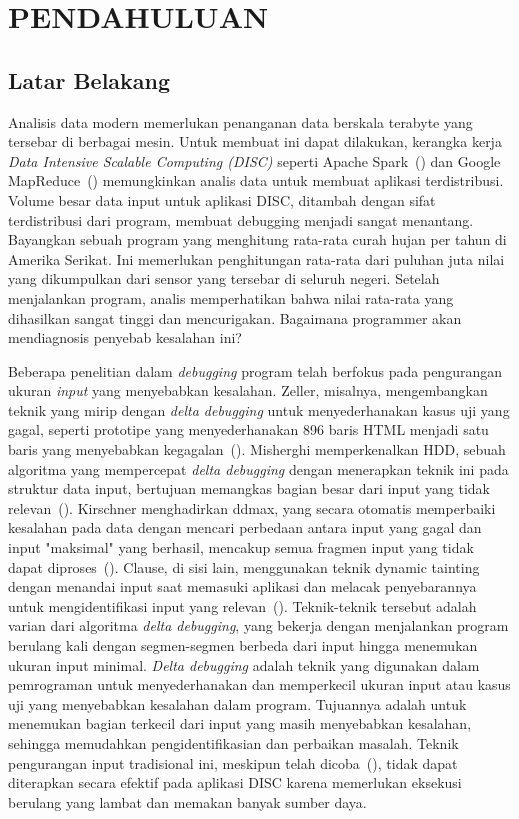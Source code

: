 \chapter{PENDAHULUAN}\label{chap:pendahuluan}


\section{Latar Belakang}\label{sec:latarbelakang}

Analisis data modern memerlukan penanganan data berskala 
terabyte yang tersebar di berbagai mesin. Untuk membuat 
ini dapat dilakukan, kerangka kerja 
\emph{Data Intensive Scalable Computing (DISC)} seperti 
Apache Spark~(\cite{zaharia2010,spark}) dan 
Google MapReduce~(\cite{dean2008}) memungkinkan analis 
data untuk membuat aplikasi terdistribusi. Volume besar 
data input untuk aplikasi DISC, ditambah dengan sifat 
terdistribusi dari program, membuat debugging menjadi 
sangat menantang.
Bayangkan sebuah program yang menghitung rata-rata 
curah hujan per tahun di Amerika Serikat. Ini 
memerlukan penghitungan rata-rata dari puluhan 
juta nilai yang dikumpulkan dari sensor yang 
tersebar di seluruh negeri. Setelah menjalankan 
program, analis memperhatikan bahwa nilai rata-rata 
yang dihasilkan sangat tinggi dan mencurigakan. 
Bagaimana programmer akan mendiagnosis penyebab 
kesalahan ini?

Beberapa penelitian dalam \emph{debugging} program telah berfokus pada pengurangan ukuran \emph{input} yang menyebabkan kesalahan. Zeller, misalnya, mengembangkan teknik yang mirip dengan \emph{delta debugging} untuk menyederhanakan kasus uji yang gagal, seperti prototipe yang menyederhanakan 896 baris HTML menjadi satu baris yang menyebabkan kegagalan~(\cite{zeller2002}). Misherghi memperkenalkan HDD, sebuah algoritma yang mempercepat \emph{delta debugging} dengan menerapkan teknik ini pada struktur data input, bertujuan memangkas bagian besar dari input yang tidak relevan~(\cite{misherghi2006}). Kirschner menghadirkan ddmax, yang secara otomatis memperbaiki kesalahan pada data dengan mencari perbedaan antara input yang gagal dan input "maksimal" yang berhasil, mencakup semua fragmen input yang tidak dapat diproses~(\cite{kirschner2020}). Clause, di sisi lain, menggunakan teknik dynamic tainting dengan menandai input saat memasuki aplikasi dan melacak penyebarannya untuk mengidentifikasi input yang relevan~(\cite{clause2009}). Teknik-teknik tersebut adalah varian dari algoritma \emph{delta debugging}, yang bekerja dengan menjalankan program berulang kali dengan segmen-segmen berbeda dari input hingga menemukan ukuran input minimal. \emph{Delta debugging} adalah teknik yang digunakan dalam pemrograman untuk menyederhanakan dan memperkecil ukuran input atau kasus uji yang menyebabkan kesalahan dalam program. Tujuannya adalah untuk menemukan bagian terkecil dari input yang masih menyebabkan kesalahan, sehingga memudahkan pengidentifikasian dan perbaikan masalah. Teknik pengurangan input tradisional ini, meskipun telah dicoba~(\cite{gulzar2018}), tidak dapat diterapkan secara efektif pada aplikasi DISC karena memerlukan eksekusi berulang yang lambat dan memakan banyak sumber daya.

